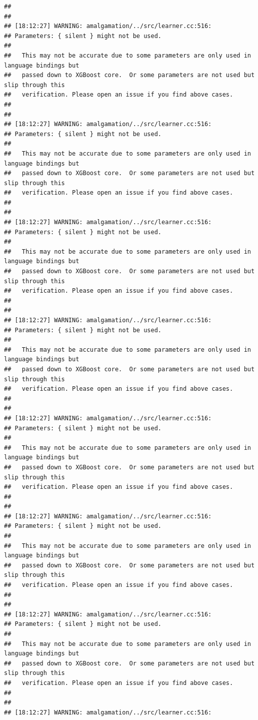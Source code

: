 \documentclass[AMS,STIX2COL]{WileyNJD-v2}\usepackage[]{graphicx}\usepackage[]{color}
\makeatletter
\newenvironment{kframe}{%
 \def\at@end@of@kframe{}%
 \ifinner\ifhmode%
  \def\at@end@of@kframe{\end{minipage}}%
  \begin{minipage}{\columnwidth}%
 \fi\fi%
 \def\FrameCommand##1{\hskip\@totalleftmargin \hskip-\fboxsep
 \colorbox{shadecolor}{##1}\hskip-\fboxsep
     \hskip-\linewidth \hskip-\@totalleftmargin \hskip\columnwidth}%
 \MakeFramed {\advance\hsize-\width
   \@totalleftmargin\z@ \linewidth\hsize
   \@setminipage}}%
 {\par\unskip\endMakeFramed%
 \at@end@of@kframe}
\newenvironment{knitrout}{}{} %
\makeatother
\begin{document}
\begin{knitrout}
\begin{kframe}
\begin{verbatim}
## 
## 
## [18:12:27] WARNING: amalgamation/../src/learner.cc:516: 
## Parameters: { silent } might not be used.
## 
##   This may not be accurate due to some parameters are only used in language bindings but
##   passed down to XGBoost core.  Or some parameters are not used but slip through this
##   verification. Please open an issue if you find above cases.
## 
## 
## [18:12:27] WARNING: amalgamation/../src/learner.cc:516: 
## Parameters: { silent } might not be used.
## 
##   This may not be accurate due to some parameters are only used in language bindings but
##   passed down to XGBoost core.  Or some parameters are not used but slip through this
##   verification. Please open an issue if you find above cases.
## 
## 
## [18:12:27] WARNING: amalgamation/../src/learner.cc:516: 
## Parameters: { silent } might not be used.
## 
##   This may not be accurate due to some parameters are only used in language bindings but
##   passed down to XGBoost core.  Or some parameters are not used but slip through this
##   verification. Please open an issue if you find above cases.
## 
## 
## [18:12:27] WARNING: amalgamation/../src/learner.cc:516: 
## Parameters: { silent } might not be used.
## 
##   This may not be accurate due to some parameters are only used in language bindings but
##   passed down to XGBoost core.  Or some parameters are not used but slip through this
##   verification. Please open an issue if you find above cases.
## 
## 
## [18:12:27] WARNING: amalgamation/../src/learner.cc:516: 
## Parameters: { silent } might not be used.
## 
##   This may not be accurate due to some parameters are only used in language bindings but
##   passed down to XGBoost core.  Or some parameters are not used but slip through this
##   verification. Please open an issue if you find above cases.
## 
## 
## [18:12:27] WARNING: amalgamation/../src/learner.cc:516: 
## Parameters: { silent } might not be used.
## 
##   This may not be accurate due to some parameters are only used in language bindings but
##   passed down to XGBoost core.  Or some parameters are not used but slip through this
##   verification. Please open an issue if you find above cases.
## 
## 
## [18:12:27] WARNING: amalgamation/../src/learner.cc:516: 
## Parameters: { silent } might not be used.
## 
##   This may not be accurate due to some parameters are only used in language bindings but
##   passed down to XGBoost core.  Or some parameters are not used but slip through this
##   verification. Please open an issue if you find above cases.
## 
## 
## [18:12:27] WARNING: amalgamation/../src/learner.cc:516: 

\end{verbatim}
\end{kframe}
\end{knitrout}
\end{document}
